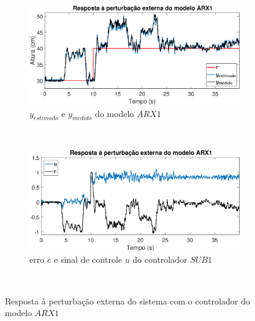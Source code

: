 \begin{figure}[H]
	\centering
	\begin{subfigure}[b]{1\textwidth}
		\includegraphics[width=1\linewidth]{pextrarx1y}
		\caption[$y_{estimado}$ e $y_{medido}$ do modelo $ARX1$]{$y_{estimado}$ e $y_{medido}$ do modelo $ARX1$}
		\label{fig:pextrarx1y}
	\end{subfigure}
	~ %
	\begin{subfigure}[b]{1\textwidth}
		\includegraphics[width=1\linewidth]{pextrarx1e}
		\caption[erro $e$ e sinal de controle $u$ do controlador $SUB1$]{erro $e$ e sinal de controle $u$ do controlador $SUB1$}
		\label{fig:pextrarx1e}
	\end{subfigure}
	~ %
	
	\caption{Resposta à perturbação externa do sistema com o controlador do modelo $ARX1$}\label{fig:pextrarx1}
\end{figure}

